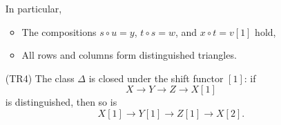 \begin{definition}
\begin{itemize}
    In particular,
    \begin{itemize}
        \item The compositions $s \circ u = y$, $t \circ s = w$, and $x \circ t = v[1]$ hold,
        \item All rows and columns form distinguished triangles.
    \end{itemize}

    \item[(TR4)] The class $\Delta$ is closed under the shift functor $[1]$: if
    $$X \to Y \to Z \to X[1]$$
    is distinguished, then so is
    $$X[1] \to Y[1] \to Z[1] \to X[2].$$
\end{itemize}
\end{definition}

